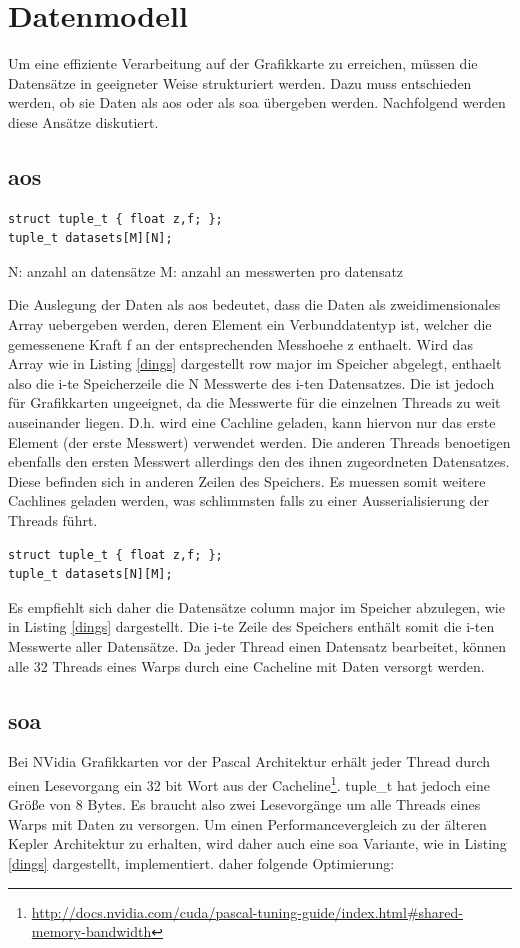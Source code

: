 \section{Datenmodell}
Um eine effiziente Verarbeitung auf der Grafikkarte zu erreichen, müssen die Datensätze in geeigneter Weise strukturiert werden.
Dazu muss entschieden werden, ob sie Daten als \gls{aos} oder als \gls{soa} übergeben werden. Nachfolgend werden diese Ansätze diskutiert.

\subsection{\acrlong{aos}}
\begin{lstlisting}
struct tuple_t { float z,f; };
tuple_t datasets[M][N];
\end{lstlisting}

N: anzahl an datensätze
M: anzahl an messwerten pro datensatz

Die Auslegung der Daten als \gls{aos} bedeutet, dass die Daten als zweidimensionales Array uebergeben werden, deren Element ein Verbunddatentyp ist, welcher die gemessenene Kraft f an der entsprechenden Messhoehe z enthaelt. Wird das Array wie in Listing \ref{dings} dargestellt row major im Speicher abgelegt, enthaelt also die i-te Speicherzeile die N Messwerte des i-ten Datensatzes.
Die ist jedoch für Grafikkarten ungeeignet, da die Messwerte für die einzelnen Threads zu weit auseinander liegen. D.h. wird eine Cachline geladen, kann hiervon nur das erste Element (der erste Messwert) verwendet werden. Die anderen Threads benoetigen ebenfalls den ersten Messwert allerdings den des ihnen zugeordneten Datensatzes. Diese befinden sich in anderen Zeilen des Speichers.
Es muessen somit weitere Cachlines geladen werden, was schlimmsten falls zu einer Ausserialisierung der Threads führt.


\begin{lstlisting}
struct tuple_t { float z,f; };
tuple_t datasets[N][M];
\end{lstlisting}

Es empfiehlt sich daher die Datensätze column major im Speicher abzulegen, wie in Listing \ref{dings} dargestellt. Die i-te Zeile des Speichers enthält somit die i-ten Messwerte aller Datensätze. Da jeder Thread einen Datensatz bearbeitet, können alle 32 Threads eines Warps durch eine Cacheline mit Daten versorgt werden.


\subsection{\acrlong{soa}}
Bei NVidia Grafikkarten vor der Pascal Architektur erhält jeder Thread durch einen Lesevorgang ein 32 bit Wort aus der Cacheline\footnote{\href{http://docs.nvidia.com/cuda/pascal-tuning-guide/index.html\#shared-memory-bandwidth}{http://docs.nvidia.com/cuda/pascal-tuning-guide/index.html\#shared-memory-bandwidth}}. tuple\_t hat jedoch eine Größe von 8 Bytes. 
Es braucht also zwei Lesevorgänge um alle Threads eines Warps mit Daten zu versorgen.
Um einen Performancevergleich zu der älteren Kepler Architektur zu erhalten, wird daher auch eine \gls{soa} Variante, wie in Listing \ref{dings} dargestellt, implementiert.
daher folgende Optimierung:

